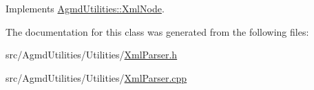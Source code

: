 Implements \hyperlink{class_agmd_utilities_1_1_xml_node_a896674ddea53e7375025c1458531b3d2}{Agmd\+Utilities\+::\+Xml\+Node}.



The documentation for this class was generated from the following files\+:\begin{DoxyCompactItemize}
\item 
src/\+Agmd\+Utilities/\+Utilities/\hyperlink{_xml_parser_8h}{Xml\+Parser.\+h}\item 
src/\+Agmd\+Utilities/\+Utilities/\hyperlink{_xml_parser_8cpp}{Xml\+Parser.\+cpp}\end{DoxyCompactItemize}
